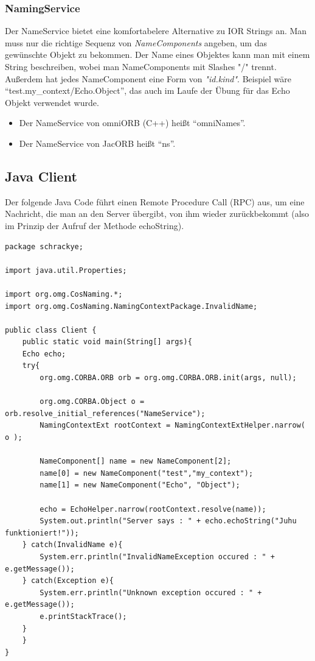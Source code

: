 \documentclass[11pt]{article}
\begin{document}
\subsubsection{NamingService}
Der NameService bietet eine komfortabelere Alternative zu IOR Strings an. Man muss nur die richtige Sequenz von \textit{NameComponents} angeben, um das gewünschte Objekt zu bekommen. Der Name eines Objektes kann man mit einem String beschreiben, wobei man NameComponents mit Slashes "/" trennt. Außerdem hat jedes NameComponent eine Form von \textit{"id.kind"}. Beispiel wäre ``test.my\_context/Echo.Object'', das auch im Laufe der Übung für das Echo Objekt verwendet wurde.
\begin{itemize}
\item Der NameService von omniORB (C++) heißt ``omniNames''.
\item Der NameService von JacORB heißt ``ns''.
\end{itemize}
\subsection{Java Client}

Der folgende Java Code führt einen Remote Procedure Call (RPC) aus, um eine Nachricht, die man an den Server übergibt, von ihm wieder zurückbekommt (also im Prinzip der Aufruf der Methode echoString).

\begin{lstlisting}
package schrackye;

import java.util.Properties;

import org.omg.CosNaming.*;
import org.omg.CosNaming.NamingContextPackage.InvalidName;

public class Client {
    public static void main(String[] args){
	Echo echo;
	try{
	    org.omg.CORBA.ORB orb = org.omg.CORBA.ORB.init(args, null);

	    org.omg.CORBA.Object o = orb.resolve_initial_references("NameService");
	    NamingContextExt rootContext = NamingContextExtHelper.narrow( o );
			
	    NameComponent[] name = new NameComponent[2];
	    name[0] = new NameComponent("test","my_context");
	    name[1] = new NameComponent("Echo", "Object");
		
	    echo = EchoHelper.narrow(rootContext.resolve(name));
	    System.out.println("Server says : " + echo.echoString("Juhu funktioniert!"));
	} catch(InvalidName e){
	    System.err.println("InvalidNameException occured : " + e.getMessage());
	} catch(Exception e){
	    System.err.println("Unknown exception occured : " + e.getMessage());
	    e.printStackTrace();
	}
    }
}
\end{lstlisting}
\end{document}
